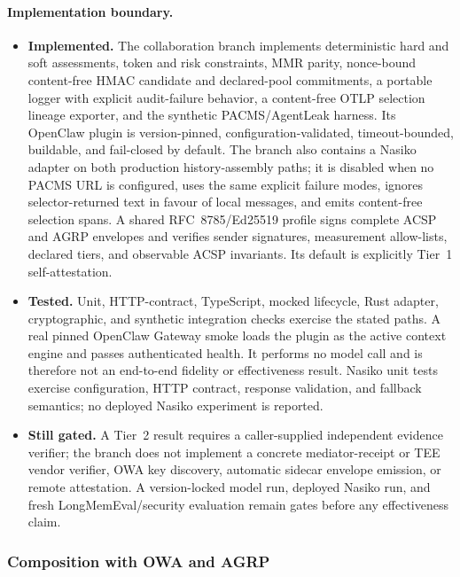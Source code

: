 \paragraph{Implementation boundary.}
\begin{itemize}
  \item \textbf{Implemented.} The collaboration branch
    implements deterministic hard and soft assessments,
    token and risk constraints, MMR parity, nonce-bound
    content-free HMAC candidate and declared-pool
    commitments, a portable logger with explicit
    audit-failure behavior, a content-free OTLP selection
    lineage exporter, and the synthetic PACMS/AgentLeak
    harness. Its OpenClaw plugin is version-pinned,
    configuration-validated, timeout-bounded, buildable, and
    fail-closed by default. The branch also contains a Nasiko
    adapter on both production history-assembly paths; it is
    disabled when no PACMS URL is configured, uses the same
    explicit failure modes, ignores selector-returned text in
    favour of local messages, and emits content-free
    selection spans. A shared RFC~8785/Ed25519 profile signs
    complete ACSP and AGRP envelopes and verifies sender
    signatures, measurement allow-lists, declared tiers, and
    observable ACSP invariants. Its default is explicitly
    Tier~1 self-attestation.

  \item \textbf{Tested.} Unit, HTTP-contract, TypeScript,
    mocked lifecycle, Rust adapter, cryptographic, and
    synthetic integration checks exercise the stated paths.
    A real pinned OpenClaw Gateway smoke loads the plugin as
    the active context engine and passes authenticated
    health. It performs no model call and is therefore not
    an end-to-end fidelity or effectiveness result. Nasiko
    unit tests exercise configuration, HTTP contract,
    response validation, and fallback semantics; no deployed
    Nasiko experiment is reported.

  \item \textbf{Still gated.} A Tier~2 result requires a
    caller-supplied independent evidence verifier; the branch
    does not implement a concrete mediator-receipt or TEE
    vendor verifier, OWA key discovery, automatic sidecar
    envelope emission, or remote attestation. A
    version-locked model run, deployed Nasiko run, and fresh
    LongMemEval/security evaluation remain gates before any
    effectiveness claim.
\end{itemize}

\subsubsection{Composition with OWA and AGRP}
\label{sec:proposals:acsp:composition}

